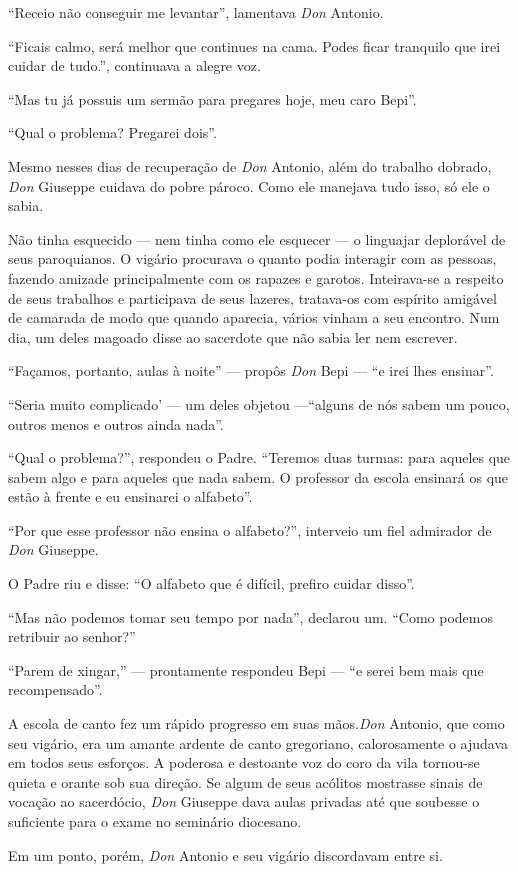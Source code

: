 \documentclass[12pt,a4paper,oneside]{book}
\begin{document}
\quad ``Receio não conseguir me levantar'', lamentava \emph{Don} Antonio.

\quad ``Ficais calmo, será melhor que continues na cama. Podes ficar tranquilo que irei cuidar de tudo.'', continuava a alegre voz.

\quad ``Mas tu já possuis um sermão para pregares hoje, meu caro Bepi''.

\quad ``Qual o problema? Pregarei dois''.

\quad Mesmo nesses dias de recuperação de \emph{Don} Antonio, além do trabalho dobrado, \emph{Don} Giuseppe cuidava do pobre pároco. Como ele manejava tudo isso, só ele o sabia.

\quad Não tinha esquecido --- nem tinha como ele esquecer --- o linguajar deplorável de seus paroquianos. O vigário procurava o quanto podia interagir com as pessoas, fazendo amizade principalmente com os rapazes e garotos. Inteirava-se a respeito de seus trabalhos e participava de seus lazeres, tratava-os com espírito amigável de camarada de modo que quando aparecia, vários vinham a seu encontro. Num dia, um deles magoado disse ao sacerdote que não sabia ler nem escrever.

\quad ``Façamos, portanto, aulas à noite'' --- propôs \emph{Don} Bepi --- ``e irei lhes ensinar''.

\quad ``Seria muito complicado' --- um deles objetou ---``alguns de nós sabem um pouco, outros menos e outros ainda nada''.

\quad ``Qual o problema?'', respondeu o Padre. ``Teremos duas turmas: para aqueles que sabem algo e para aqueles que nada sabem. O professor da escola ensinará os que estão à frente e eu ensinarei o alfabeto''.

\quad ``Por que esse professor não ensina o alfabeto?'', interveio um fiel admirador de \emph{Don} Giuseppe.

\quad O Padre riu e disse: ``O alfabeto que é difícil, prefiro cuidar disso''.

\quad  ``Mas não podemos tomar seu tempo por nada'', declarou um. ``Como podemos retribuir ao senhor?''

\quad ``Parem de xingar,'' --- prontamente respondeu Bepi --- ``e serei bem mais que recompensado''.

\quad A escola de canto fez um rápido progresso em suas mãos.\emph{Don} Antonio, que como seu vigário, era um amante ardente de canto gregoriano, calorosamente o ajudava em todos seus esforços. A poderosa e destoante voz do coro da vila tornou-se quieta e orante sob sua direção. Se algum de seus acólitos mostrasse sinais de vocação ao sacerdócio, \emph{Don} Giuseppe dava aulas privadas até que soubesse o suficiente para o exame no seminário diocesano.

\quad Em um ponto, porém, \emph{Don} Antonio e seu vigário discordavam entre si.
\end{document}

